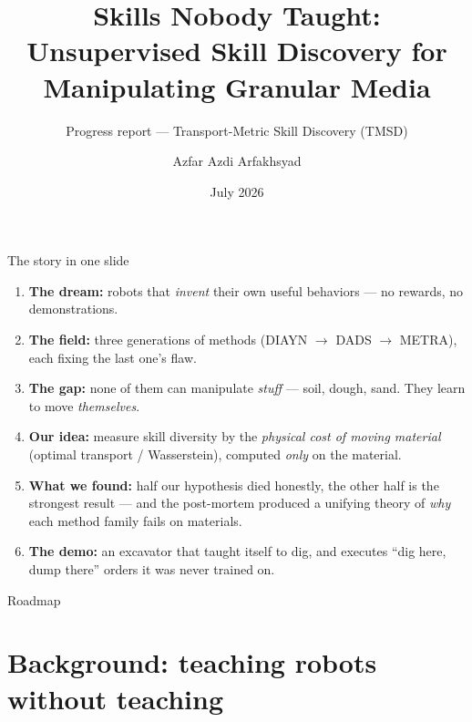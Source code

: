 \documentclass[aspectratio=169,11pt]{beamer}
\title{Skills Nobody Taught:\\ Unsupervised Skill Discovery for Manipulating Granular Media}
\subtitle{Progress report — Transport-Metric Skill Discovery (TMSD)}
\author{Azfar Azdi Arfakhsyad}
\date{July 2026}
\begin{document}
\maketitle

\begin{frame}{The story in one slide}
\begin{enumerate}
  \item \textbf{The dream:} robots that \emph{invent} their own useful behaviors --- no rewards, no demonstrations.
  \item \textbf{The field:} three generations of methods (DIAYN $\to$ DADS $\to$ METRA), each fixing the last one's flaw.
  \item \textbf{The gap:} none of them can manipulate \emph{stuff} --- soil, dough, sand. They learn to move \emph{themselves}.
  \item \textbf{Our idea:} measure skill diversity by the \emph{physical cost of moving material} (optimal transport / Wasserstein), computed \emph{only} on the material.
  \item \textbf{What we found:} half our hypothesis died honestly, the other half is the strongest result --- and the post-mortem produced a unifying theory of \emph{why} each method family fails on materials.
  \item \textbf{The demo:} an excavator that taught itself to dig, and executes ``dig here, dump there'' orders it was never trained on.
\end{enumerate}
\end{frame}

\begin{frame}{Roadmap}
\tableofcontents
\end{frame}

\section{Background: teaching robots without teaching}
\end{document}

